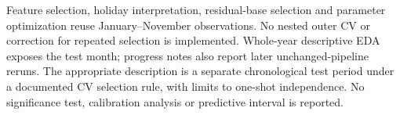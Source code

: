 Feature selection, holiday interpretation, residual-base selection and parameter optimization reuse January--November observations. No nested outer CV or correction for repeated selection is implemented. Whole-year descriptive EDA exposes the test month; progress notes also report later unchanged-pipeline reruns. The appropriate description is a separate chronological test period under a documented CV selection rule, with limits to one-shot independence. No significance test, calibration analysis or predictive interval is reported.
